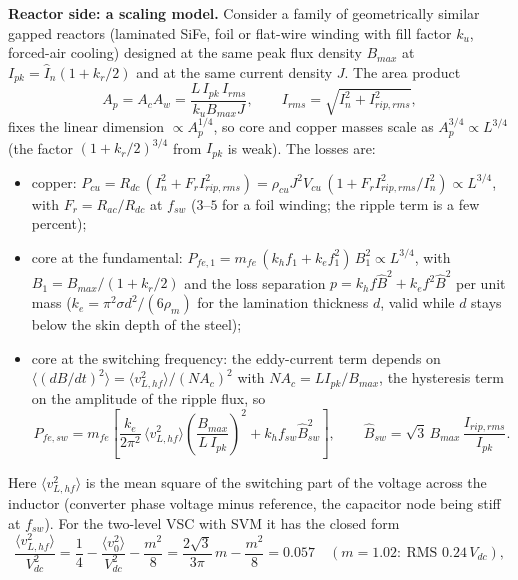 \documentclass[10pt,a4paper]{scrartcl}
\newcommand{\Vdc}{V_{dc}}
\newcommand{\fsw}{f_{sw}}
\begin{document}
\begin{onehalfspace}
\textbf{Reactor side: a scaling model.} Consider a family of geometrically similar gapped reactors (laminated SiFe, foil or flat-wire winding with fill factor $k_u$, forced-air cooling) designed at the same peak flux density $B_{max}$ at $I_{pk} = \hat I_n(1 + k_r/2)$ and at the same current density $J$. The area product
\begin{equation}
A_p = A_c A_w = \frac{L\,I_{pk}\,I_{rms}}{k_u B_{max} J},\qquad I_{rms} = \sqrt{I_n^2 + I_{rip,rms}^2},
\label{eq:Ap}
\end{equation}
fixes the linear dimension $\propto A_p^{1/4}$, so core and copper masses scale as $A_p^{3/4} \propto L^{3/4}$ (the factor $(1 + k_r/2)^{3/4}$ from $I_{pk}$ is weak). The losses are:
\begin{itemize}
\item copper: $P_{cu} = R_{dc}\,(I_n^2 + F_r I_{rip,rms}^2) = \rho_{cu} J^2 V_{cu}\,(1 + F_r I_{rip,rms}^2/I_n^2) \propto L^{3/4}$, with $F_r = R_{ac}/R_{dc}$ at $\fsw$ ($3$--$5$ for a foil winding; the ripple term is a few percent);
\item core at the fundamental: $P_{fe,1} = m_{fe}\,(k_h f_1 + k_e f_1^2)\,B_1^2 \propto L^{3/4}$, with $B_1 = B_{max}/(1 + k_r/2)$ and the loss separation $p = k_h f \hat B^2 + k_e f^2 \hat B^2$ per unit mass ($k_e = \pi^2\sigma d^2/(6\rho_m)$ for the lamination thickness $d$, valid while $d$ stays below the skin depth of the steel);
\item core at the switching frequency: the eddy-current term depends on $\langle (dB/dt)^2\rangle = \langle v_{L,hf}^2\rangle/(N A_c)^2$ with $N A_c = L I_{pk}/B_{max}$, the hysteresis term on the amplitude of the ripple flux, so
\begin{equation}
P_{fe,sw} = m_{fe}\left[\frac{k_e}{2\pi^2}\,\langle v_{L,hf}^2\rangle\left(\frac{B_{max}}{L\,I_{pk}}\right)^{2} + k_h \fsw \hat B_{sw}^2\right],\qquad
\hat B_{sw} = \sqrt3\,B_{max}\,\frac{I_{rip,rms}}{I_{pk}}.
\label{eq:Pfesw}
\end{equation}
\end{itemize}
Here $\langle v_{L,hf}^2\rangle$ is the mean square of the switching part of the voltage across the inductor (converter phase voltage minus reference, the capacitor node being stiff at $\fsw$). For the two-level VSC with SVM it has the closed form
\begin{equation}
\frac{\langle v_{L,hf}^2\rangle}{\Vdc^2} = \frac14 - \frac{\langle v_0^2\rangle}{\Vdc^2} - \frac{m^2}{8} = \frac{2\sqrt3}{3\pi}\,m - \frac{m^2}{8} = 0.057\quad (m = 1.02:\ \text{RMS } 0.24\,\Vdc),

\end{equation}
\end{onehalfspace}
\end{document}
